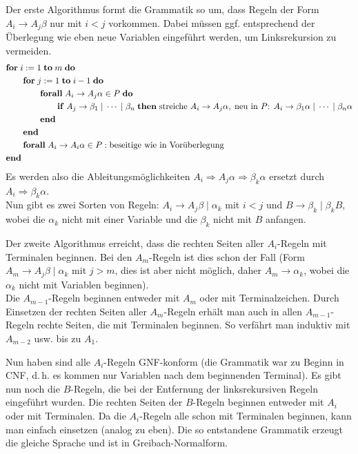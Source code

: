 \begin{Beweis}
    Der erste Algorithmus formt die Grammatik so um, dass Regeln der Form
    $A_i \rightarrow A_j \beta$ nur mit $i < j$ vorkommen.
    Dabei müssen ggf. entsprechend der Überlegung wie eben neue Variablen
    eingeführt werden, um Linksrekursion zu vermeiden.
    \begin{align*}&
        \mathbf{for}\; i := 1 \;\mathbf{to}\; m \;\mathbf{do}\;\\&
        \qquad\mathbf{for}\; j := 1 \;\mathbf{to}\; i - 1 \;\mathbf{do}\;\\&
        \qquad\qquad\mathbf{forall}\; A_i \rightarrow A_j \alpha \in P \;\mathbf{do}\;\\&
        \qquad\qquad\qquad\mathbf{if}\; A_j \rightarrow
        \beta_1 \;|\; \dotsb \;|\; \beta_n
        \;\mathbf{then}\; \text{streiche }A_i \rightarrow A_j \alpha,\;
        \text{neu in }P\text{: } A_i \rightarrow \beta_1 \alpha \;|\; \dotsb
        \;|\; \beta_n \alpha\\&
        \qquad\qquad\mathbf{end}\;\\&
        \qquad\mathbf{end}\;\\&
        \qquad\mathbf{forall}\; A_i \rightarrow A_i \alpha \in P:
        \text{beseitige wie in Vorüberlegung}\\&
        \mathbf{end}\;
    \end{align*}
    Es werden also die Ableitungsmöglichkeiten
    $A_i \Rightarrow A_j \alpha \Rightarrow \beta_k \alpha$ ersetzt durch
    $A_i \Rightarrow \beta_k \alpha$.\\
    Nun gibt es zwei Sorten von Regeln:
    $A_i \rightarrow A_j \beta \;|\; \alpha_k$ mit $i < j$ und
    $B \rightarrow \beta_k \;|\; \beta_k B$, wobei die
    $\alpha_k$ nicht mit einer Variable und die
    $\beta_k$ nicht mit $B$ anfangen.
    
    Der zweite Algorithmus erreicht, dass die rechten Seiten aller $A_i$-Regeln
    mit Terminalen beginnen.
    Bei den $A_m$-Regeln ist dies schon der Fall
    (Form $A_m \rightarrow A_j \beta \;|\; \alpha_k$ mit $j > m$,
    dies ist aber nicht möglich, daher
    $A_m \rightarrow \alpha_k$, wobei die $\alpha_k$ nicht mit Variablen
    beginnen).\\
    Die $A_{m-1}$-Regeln beginnen entweder mit $A_m$ oder mit Terminalzeichen.
    Durch Einsetzen der rechten Seiten aller $A_m$-Regeln erhält man auch in
    allen $A_{m-1}$-Regeln rechte Seiten, die mit Terminalen beginnen.
    So verfährt man induktiv mit $A_{m-2}$ usw. bis zu $A_1$.
    
    Nun haben sind alle $A_i$-Regeln GNF-konform
    (die Grammatik war zu Beginn in CNF, d.\,h. es kommen nur Variablen
    nach dem beginnenden Terminal).
    Es gibt nun noch die $B$-Regeln, die bei der Entfernung der linksrekursiven
    Regeln eingeführt wurden.
    Die rechten Seiten der $B$-Regeln beginnen entweder mit $A_i$ oder mit
    Terminalen.
    Da die $A_i$-Regeln alle schon mit Terminalen beginnen, kann man einfach
    einsetzen (analog zu eben).
    Die so entstandene Grammatik erzeugt die gleiche Sprache und ist in
    Greibach-Normalform.
\end{Beweis}

